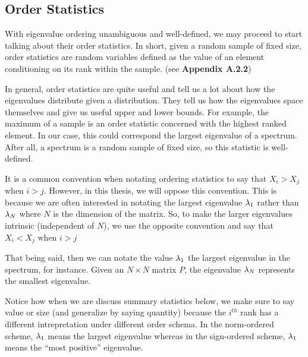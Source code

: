 \newpage
\subsection{Order Statistics}


With eigenvalue ordering unambiguous and well-defined, we may proceed to start talking about their order statistics.
In short, given a random sample of fixed size, order statistics are random variables defined as the value of an element conditioning on its rank within the sample. (see \textbf{Appendix A.2.2})

In general, order statistics are quite useful and tell us a lot about how the eigenvalues distribute given a distribution.
They tell us how the eigenvalues space themselves and give us useful upper and lower bounds.
For example, the maximum of a sample is an order statistic concerned with the highest ranked element.
In our case, this could correspond the largest eigenvalue of a spectrum. After all, a spectrum is a random sample of fixed size, so this statistic is well-defined.

\begin{remark}[Indices]
It is a common convention when notating ordering statistics to say that $X_i > X_j$ when $i > j$. However, in this thesis, we will oppose this convention.
This is because we are often interested in notating the largest eigenvalue $\lambda_1$ rather than $\lambda_N$ where $N$ is the dimension of the matrix.
So, to make the larger eigenvalues intrinsic (independent of $N$), we use the opposite convention and say that $X_i < X_j$ when $i > j$
\end{remark}

That being said, then we can notate the value $\lambda_1$ the largest eigenvalue in the spectrum, for instance.
Given an $N \times N$ matrix $P$, the eigenvalue $\lambda_N$ represents the smallest eigenvalue.

\begin{warning}
Notice how when we are discuss summary statistics below, we make sure to say value or size (and generalize by saying quantity) because the $i^{th}$ rank has a different intrepretation under different order schema.
In the norm-ordered scheme, $\lambda_1$ means the largest eigenvalue whereas in the sign-ordered scheme, $\lambda_1$ means the ``most positive'' eigenvalue.
\end{warning}


